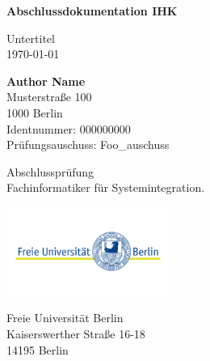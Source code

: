 \begin{titlepage}
    \begin{center}
        \Huge
        \textbf{Abschlussdokumentation IHK}

        \vspace{0.5cm}
        \LARGE
        Untertitel \\
        \today

        \vspace{1.5cm}

        \textbf{Author Name} \\
        Musterstraße 100 \\
        1000 Berlin \\
        Identnummer: 000000000 \\
        Prüfungsauschuss: Foo\_auschuss

        \vfill

        Abschlussprüfung \\
        Fachinformatiker für Systemintegration.

        \vspace{0.8cm}

        \includegraphics[width=0.4\textwidth]{fu_logo.png}

        \Large
        Freie Universität Berlin\\
        Kaiserswerther Straße 16-18 \\
        14195 Berlin \\

    \end{center}
\end{titlepage}